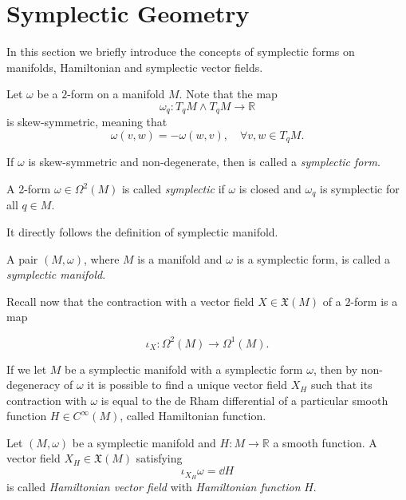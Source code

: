 \section{Symplectic Geometry}
\label{sec:symplectic_geom}

In this section we briefly introduce the concepts of symplectic forms on manifolds, Hamiltonian and symplectic vector fields.

Let $\omega$ be a $2$-form on a manifold $M$. Note that the map
\begin{equation*}
    \omega_q : T_q M \wedge T_q M \rightarrow \mathbb{R}
\end{equation*}
is skew-symmetric, meaning that
\begin{equation*}
    \omega(v, w) = -\omega(w, v), \quad \forall v, w \in T_q M.
\end{equation*}

If $\omega$ is skew-symmetric and non-degenerate, then is called a \emph{symplectic form}.

\begin{definition}
    A 2-form $\omega \in \Omega^2(M)$ is called \emph{symplectic} if $\omega$ is closed and $\omega_q$ is symplectic for all $q \in M$.
\end{definition}

It directly follows the definition of symplectic manifold.
\begin{definition}
\label{def:sympl_mnf}
    A pair $(M, \omega)$, where $M$ is a manifold and $\omega$ is a symplectic form, is called a \emph{symplectic manifold}.
\end{definition}

Recall now that the contraction with a vector field $X \in \mathfrak{X}(M)$ of a $2$-form is a map

\begin{equation*}
    \iota_X : \Omega^2(M) \rightarrow \Omega^1(M).
\end{equation*}

If we let $M$ be a symplectic manifold with a symplectic form $\omega$, then by non-degeneracy of $\omega$ it is possible to find a unique vector field $X_H$ such that its contraction with $\omega$ is equal to the de Rham differential of a particular smooth function $H \in C^\infty(M)$, called Hamiltonian function.

\begin{definition}
    Let $(M, \omega)$ be a symplectic manifold and $H:M\rightarrow \mathbb{R}$ a smooth function.
    A vector field $X_H \in \mathfrak{X}(M)$ satisfying
    \begin{equation*}
        \iota_{X_H}\omega = \dd H
    \end{equation*}
    is called \emph{Hamiltonian vector field} with \emph{Hamiltonian function} $H$.
\end{definition}

